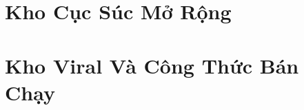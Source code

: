 \documentclass[14pt,a4paper,twoside]{extbook}
\begin{document}





\frontmatter
\tableofcontents
\clearpage


\mainmatter











\part{Kho Cục Súc Mở Rộng}



\part{Kho Viral Và Công Thức Bán Chạy}



\backmatter

\end{document}

